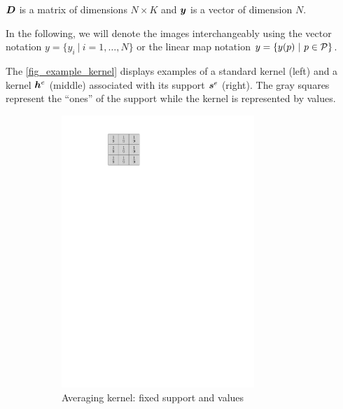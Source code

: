  $\D$ is a matrix of dimensions $N \times K$ and $\y$ is a vector of dimension $N$.

In the following, we will denote the images interchangeably using the vector notation $y = \{ y_i ~|~ i=1,\dots,N \}$ or the linear map notation $y = \{y(p) ~|~ p \in \P\}$.

The \cref{fig_example_kernel} displays examples of a standard kernel (left) and a kernel $\h^e$ (middle) associated with its support $\s^e$ (right). The gray squares represent the “ones” of the support while the kernel is represented by values.

\begin{figure}[!ht]\centering
\begin{subfigure}[b]{0.20\textwidth}\centering
\includegraphics[width=0.80\textwidth]{figures/kernel-exple.pdf}
\caption{Averaging kernel: fixed support and values}
\end{subfigure}
\begin{subfigure}[b]{0.79\textwidth}\centering

\end{subfigure}
\end{figure}
